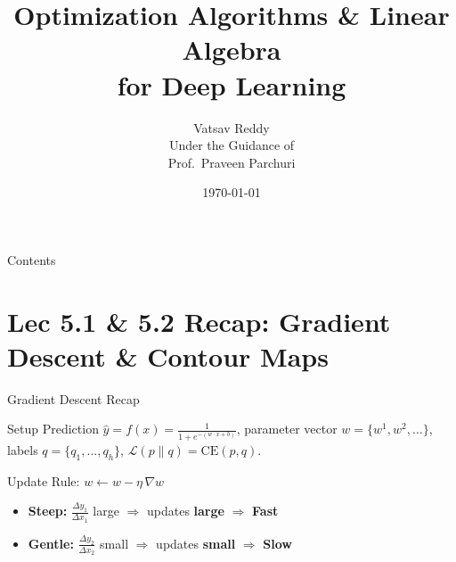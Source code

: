 \documentclass{beamer}
\title[Optimization \& Linear Algebra]{%
  Optimization Algorithms \& Linear Algebra\\[4pt]
  for Deep Learning}
\author[Vatsav Reddy]{%
  \texorpdfstring{%
    {\Large Vatsav Reddy}\\[6pt]
    {\small Under the Guidance of}\\[2pt]
    {\small Prof.\ Praveen Parchuri}%
  }{Vatsav Reddy}}
\institute[IIITH]{%
  {\normalsize International Institute of Information Technology, Hyderabad}}
\date{\today}
\begin{document}
\begin{frame}
  \titlepage
\end{frame}

\begin{frame}[shrink=10]{Contents}
  \tableofcontents
\end{frame}


\section{Lec 5.1 \& 5.2 Recap: Gradient Descent \& Contour Maps}

\begin{frame}[shrink=10]{Gradient Descent Recap}
  \begin{block}{Setup}
    Prediction $\hat{y} = f(x) = \tfrac{1}{1+e^{-(w\cdot x+b)}}$,\quad
    parameter vector $w = \{w^1, w^2, \ldots\}$,\quad
    labels $q = \{q_1,\ldots,q_h\}$,\quad
    $\mathcal{L}(p\|q) = \mathrm{CE}(p,q)$.
  \end{block}

  \medskip

  \begin{block}{Update Rule: $w \leftarrow w - \eta\,\nabla w$}
    \begin{itemize}\setlength\itemsep{3pt}
      \item \textbf{Steep:}  $\frac{\Delta y_1}{\Delta x_1}$ large
            $\Rightarrow$ updates \textbf{large} $\Rightarrow$ \textbf{Fast}
      \item \textbf{Gentle:} $\frac{\Delta y_2}{\Delta x_2}$ small
            $\Rightarrow$ updates \textbf{small} $\Rightarrow$ \textbf{Slow}
    \end{itemize}
  \end{block}
\end{frame}
\end{document}
